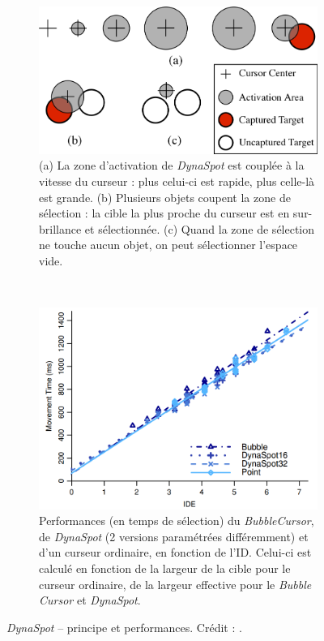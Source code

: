 	\begin{figure}[!htb]
		\begin{subfigure}[t]{0.49\textwidth}
			\centering
			\includegraphics[width=\textwidth]{figures/ch2/dynaSpot}
			\caption{(a) La zone d'activation de \emph{DynaSpot} est couplée à la vitesse du curseur : plus celui-ci est rapide, plus celle-là est grande. (b) Plusieurs objets coupent la zone de sélection : la cible la plus proche du curseur est en sur-brillance et sélectionnée. (c) Quand la zone de sélection ne touche aucun objet, on peut sélectionner l'espace vide.}
			\label{fig:dynaSpot}
		\end{subfigure}
		~
		\begin{subfigure}[t]{0.49\textwidth}
			\centering
			\includegraphics[width=\textwidth]{figures/ch2/dynaResults}
			\caption{Performances (en temps de sélection) du \emph{BubbleCursor}, de \emph{DynaSpot} (2 versions paramétrées différemment) et d'un curseur ordinaire, en fonction de l'ID. Celui-ci est calculé en fonction de la largeur de la cible pour le curseur ordinaire, de la largeur effective pour le \emph{Bubble Cursor} et \emph{DynaSpot}.}
			\label{fig:dynaResults}
		\end{subfigure}
		\caption[\emph{DynaSpot} -- principe et performances]{\emph{DynaSpot} -- principe et performances. Crédit : \cite{chapuis2009dynaspot}.}
		\label{fig:dynaSpotRes}
	\end{figure}
	
